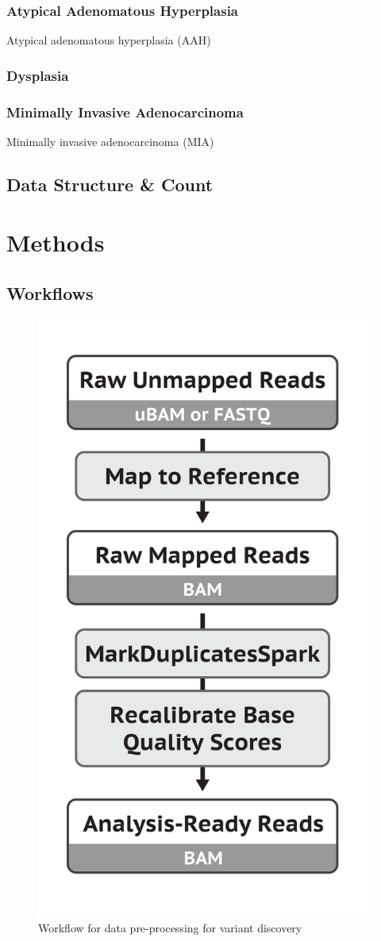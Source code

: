\documentclass[11pt,a4paper,onecolumn,oneside]{report}
\begin{document}
            \subsubsection{Atypical Adenomatous Hyperplasia}
                Atypical adenomatous hyperplasia (AAH)

            \subsubsection{Dysplasia}

            \subsubsection{Minimally Invasive Adenocarcinoma}
                Minimally invasive adenocarcinoma (MIA)

        \subsection{Data Structure \& Count}
    \newpage

    \section{Methods}
        \subsection{Workflows}

            \begin{figure}[p]
                \centering
                \includegraphics[width=0.3 \linewidth]{figures/Workflow/mapping.png}
                \caption{Workflow for data pre-processing for variant discovery \protect\cite{gatk1, gatk2}}
                \label{fig:workflow-preprocessing}
            \end{figure}
\end{document}
